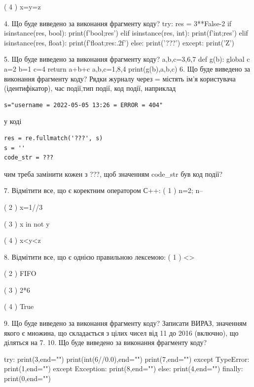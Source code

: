 \documentclass[11pt]{article}
\begin{document}
( 4 ) x=y=z

4. Що буде виведено за виконання фрагменту коду?
try:
    res = 3**False-2
    if isinstance(res, bool):
        print(f'bool;{res}')
    elif isinstance(res, int):
        print(f'int;{res}')
    elif isinstance(res, float):
        print(f'float;{res:.2f}')
    else:
        print('???')
except:
    print('Z')

5. Що буде виведено за виконання фрагменту коду?
a,b,c=3,6,7
    def g(b):
      global c      a=2
      b=1
      c=4
      return a+b+c
    a,b,c=1,8,4
    print(g(b),a,b,c)
6. Що буде виведено за виконання фрагменту коду?
Рядки журналу через = містять ім'я користувача (ідентифікатор), час події,тип події, код події, наприклад
\begin{verbatim}
s="username = 2022-05-05 13:26 = ERROR = 404"
\end{verbatim}
у коді 
\begin{verbatim}
res = re.fullmatch('???', s) 
s = ''
code_str = ??? 
\end{verbatim}
чим треба замінити кожен з ???, щоб значенням code\_str був код події? 



7. %
Відмітити все, що є коректним оператором С++:
( 1 ) n=2; n--

( 2 ) x=1//3

( 3 ) x in not y

( 4 ) x<y<z

8. %
Відмітити все, що є однією правильною лексемою:
( 1 ) <>

( 2 ) FIFO

( 3 ) 2*6

( 4 ) True

9. Що буде виведено за виконання фрагменту коду?
Записати ВИРАЗ, значенням якого є множина, що складається з цілих чисел від 11 до 2016 (включно), що діляться на 7.
10. Що буде виведено за виконання фрагменту коду?

try:
    print(3,end="")
    print(int(6//0.0),end="")
    print(7,end="")
except TypeError: print(1,end="")
except Exception: print(8,end="")
else: print(4,end="")
finally: print(0,end="")


\end{document}
